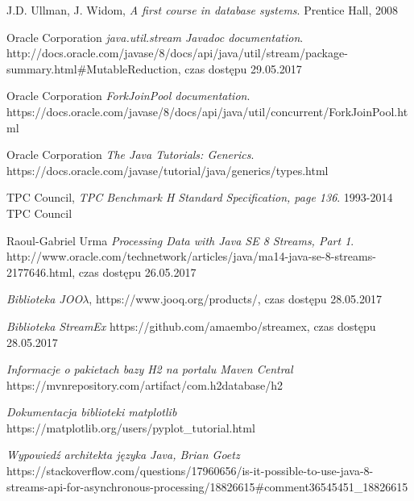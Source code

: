 \documentclass[12pt,twoside,openright]{extarticle}
\begin{document}
\begin{thebibliography}{9}

        J.D. Ullman, J. Widom,
        \textit{A first course in database systems}. 
        Prentice Hall, 2008

        Oracle Corporation
        \textit{java.util.stream Javadoc documentation}. 
        http://docs.oracle.com/javase/8/docs/api/java/util/stream/package-summary.html\#MutableReduction, czas dostępu 29.05.2017

        Oracle Corporation
        \textit{ForkJoinPool documentation}. 
        https://docs.oracle.com/javase/8/docs/api/java/util/concurrent/ForkJoinPool.html

        Oracle Corporation
        \textit{The Java Tutorials: Generics}. 
        https://docs.oracle.com/javase/tutorial/java/generics/types.html

        TPC Council,
        \textit{TPC Benchmark H Standard Specification, page 136}. 
        1993-2014 TPC Council

        Raoul-Gabriel Urma
        \textit{Processing Data with Java SE 8 Streams, Part 1}. 
        http://www.oracle.com/technetwork/articles/java/ma14-java-se-8-streams-2177646.html, czas dostępu 26.05.2017

        \textit{Biblioteka JOO$\lambda$}, https://www.jooq.org/products/, czas dostępu 28.05.2017

        \textit{Biblioteka StreamEx} https://github.com/amaembo/streamex, czas dostępu 28.05.2017

        \textit{Informacje o pakietach bazy H2 na portalu Maven Central} https://mvnrepository.com/artifact/com.h2database/h2

        \textit{Dokumentacja biblioteki matplotlib} https://matplotlib.org/users/pyplot\_tutorial.html

        \textit{Wypowiedź architekta języka Java, Brian Goetz}
        https://stackoverflow.com/questions/17960656/is-it-possible-to-use-java-8-streams-api-for-asynchronous-processing/18826615\#comment36545451\_18826615

\end{thebibliography}
\end{document}

